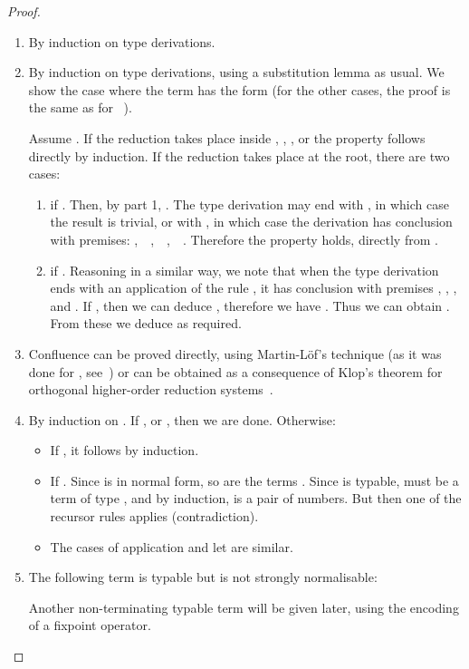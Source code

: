 \documentclass{article}
\begin{document}
\begin{proof}\ 
\begin{enumerate}
\item
By induction on  type derivations.
\item
By induction on type derivations,
using a substitution lemma as usual. 
We show the case where the term has the form  (for the other
cases, the proof is the same as for \LLCI~\cite{AlvesS:TCS}). 

Assume 
.
If the reduction takes
place inside , , ,  or  the property follows directly by
induction.
If the reduction takes place at the root, there are two cases:
\begin{enumerate}
\item
 if
  . Then, by part 1, . The type
  derivation may end with , in which case the result
  is trivial, or with , in which case the derivation has
  conclusion  with premises:
  ,\ \ ,\ \ ,\ \ 
  . Therefore the property holds, directly from  .
\item
 if
  . Reasoning in a similar way, we note that when
  the type derivation ends with an application of the rule
  , it has conclusion  with
  premises , , , and . 
If  , then we can deduce  , therefore we have . Thus we can obtain . From these we deduce
 as
required.
\end{enumerate}
\item
Confluence can be proved directly, using
Martin-L\"of's technique (as it was done for \LLCI,
see~\cite{AlvesS:phd}) or can be obtained as a consequence of Klop's
theorem for orthogonal higher-order reduction systems~\cite{KlopJW:crs}.
\item
By induction on . 
If ,  or , then we are done. Otherwise:
\begin{itemize}
\item If , it follows by induction. 
\item If . Since  is in normal form, so are
the terms .  Since  is typable,  must be a term of type
, and by induction,  is a pair of numbers. But
then one of the recursor rules applies (contradiction).
\item
The cases of application and let are similar.
\end{itemize}
\item
The following term is typable but is not strongly normalisable:

Another non-terminating typable term will be given later, using the encoding of a fixpoint operator.
\end{enumerate}
\end{proof}
\end{document}
